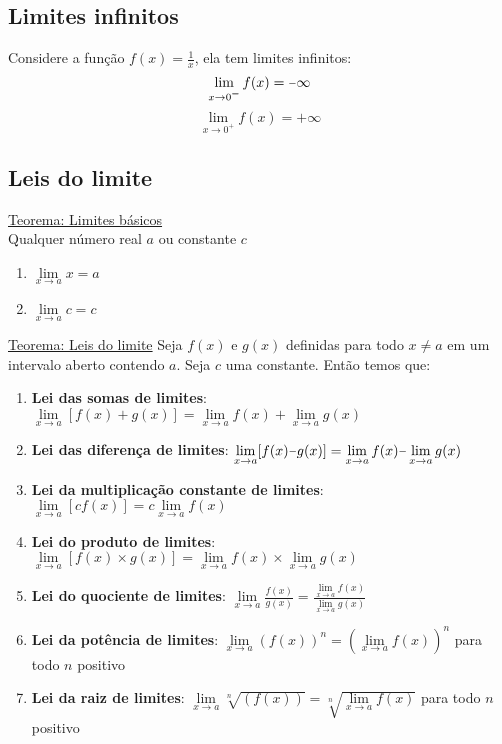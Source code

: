 \documentclass[12pt,a4paper]{article}
\newcommand{\minus}{\scalebox{0.75}[1.0]{$-$}}
\begin{document}
\subsection*{Limites infinitos}
Considere a função $f(x) = \frac{1}{x}$, ela tem limites infinitos:
\[\lim\limits_{x \to 0^{\minus}} f(x) = \minus\infty\]
\[\lim\limits_{x \to 0^{+}} f(x) = +\infty\]

\subsection*{Leis do limite}
\underline{Teorema: Limites básicos} \\
Qualquer número real $a$ ou constante $c$
\begin{center}
	\begin{enumerate}
		\item $\lim\limits_{x \to a} x = a$
		\item $\lim\limits_{x \to a} c = c$
	\end{enumerate}
\end{center}
\underline{Teorema: Leis do limite}
Seja $f(x)$ e $g(x)$ definidas para todo $x \neq a$ em um intervalo aberto contendo $a$.
Seja $c$ uma constante. Então temos que:
\begin{center}
	\begin{enumerate}
		\item \textbf{Lei das somas de limites}:
			$\lim\limits_{x \to a} [f(x) + g(x)] = \lim\limits_{x \to a} f(x) + \lim\limits_{x \to a} g(x)$
		\item \textbf{Lei das diferença de limites}:
			$\lim\limits_{x \to a} [f(x) \minus g(x)] = \lim\limits_{x \to a} f(x) \minus \lim\limits_{x \to a} g(x)$
		\item \textbf{Lei da multiplicação constante de limites}:
			$\lim\limits_{x \to a} [c f(x)] = c \lim\limits_{x \to a} f(x)$
		\item \textbf{Lei do produto de limites}:
			$\lim\limits_{x \to a} [f(x) \times g(x)] = \lim\limits_{x \to a} f(x) \times \lim\limits_{x \to a} g(x)$
		\item \textbf{Lei do quociente de limites}:
			$\lim\limits_{x \to a} \frac{f(x)}{g(x)} = \frac{\lim\limits_{x \to a} f(x)}{\lim\limits_{x \to a} g(x)}$
		\item \textbf{Lei da potência de limites}:
			$\lim\limits_{x \to a} (f(x))^n = (\lim\limits_{x \to a} f(x))^n$ para todo $n$ positivo
		\item \textbf{Lei da raiz de limites}:
			$\lim\limits_{x \to a} \sqrt[n]{(f(x))} = \sqrt[n]{\lim\limits_{x \to a} f(x)}$ para todo $n$ positivo
	\end{enumerate}
\end{center}
\end{document}
